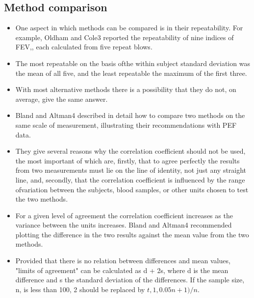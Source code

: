 \documentclass[MAIN.tex]{subfiles}
\begin{document}
\subsection*{Method comparison}
\begin{itemize}
\item One aspect in which methods can be compared
is in their repeatability. For example, Oldham
and Cole3 reported the repeatability of nine
indices of FEV,, each calculated from five
repeat blows. 
\item The most repeatable on the basis
ofthe within subject standard deviation was the
mean of all five, and the least repeatable the
maximum of the first three.
\item With most alternative methods there is a
possibility that they do not, on average, give the
same answer. 
\item Bland and Altman4 described in detail how to compare two methods on the same
scale of measurement, illustrating their recommendations with PEF data. 
\item They give several
reasons why the correlation coefficient should not be used, the most important of which are,
firstly, that to agree perfectly the results from
two measurements must lie on the line of
identity, not just any straight line, and, secondly, that the correlation coefficient is influenced by the range ofvariation between the subjects, blood samples, or other units chosen to test the two methods. 
\item For a given level of agreement the correlation coefficient increases
as the variance between the units increases. Bland and Altman4 recommended plotting
the difference in the two results against the mean value from the two methods. 
\item Provided that there is no relation between differences and mean values, "limits of agreement" can be
calculated as d + 2s, where d is the mean
difference and s the standard deviation of the
differences. If the sample size, n, is less than
100, 2 should be replaced by
$t,1,0.05 n+ 1)/n$.
\end{itemize}\newpage
\end{document}
